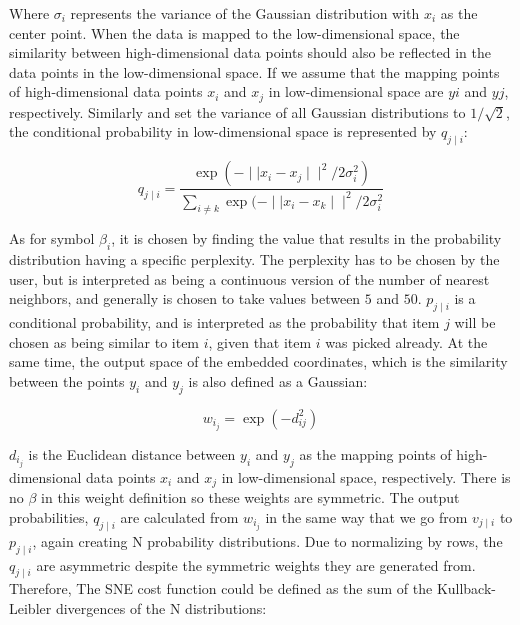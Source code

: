 \noindent Where $\sigma_i$ represents the variance of the Gaussian distribution with $x_i$ as the center point. When the data is mapped to the low-dimensional space, the similarity between high-dimensional data points should also be reflected in the data points in the low-dimensional space. If we assume that the mapping points of high-dimensional data points $x_i$ and $x_j$ in low-dimensional space are $yi$ and $yj$, respectively. Similarly and set the variance of all Gaussian distributions to $1/\sqrt2$, the conditional probability in low-dimensional space is represented by $q_{j\mid i }$:

\begin{equation*}
    {q_{j\mid i}} = \frac{\exp(-\mid \mid x_i - x_j \mid \mid^2/ 2 \sigma_i^2)}{\sum_{i\neq k}\exp(-\mid \mid x_i - x_k \mid \mid^2/ 2 \sigma_i^2}
\end{equation*}


\noindent As for symbol $\beta_i$, it is chosen by finding the value that results in the probability distribution having a specific perplexity. The perplexity has to be chosen by the user, but is interpreted as being a continuous version of the number of nearest neighbors, and generally is chosen to take values between $5$ and $50$. $p_{j\mid i}$ is a conditional probability, and is interpreted as the probability that item $j$ will be chosen as being similar to item $i$, given that item $i$ was picked already. At the same time, the output space of the embedded coordinates, which is the similarity between the points $y_i$ and $y_j$ is also defined as a Gaussian:

\begin{equation*}
    {{w_i_j} = \exp {(-d^2_{ij})} }
\end{equation*}

\noindent $d_i_j$ is the Euclidean distance between $y_i$ and $y_j$ as the mapping points of high-dimensional data points $x_i$ and $x_j$ in low-dimensional space, respectively. There is no $\beta$ in this weight definition so these weights are symmetric. The output probabilities, $q_{j\mid i}$ are calculated from $w_i_j$ in the same way that we go from ${v_{j\mid i}}$ to ${p_{j\mid i}}$, again creating N probability distributions. Due to normalizing by rows, the $q_{j\mid i}$ are asymmetric despite the symmetric weights they are generated from.\\

\noindent Therefore, The SNE cost function could be defined as the sum of the Kullback-Leibler divergences of the N distributions:

